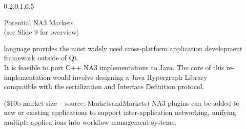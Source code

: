 \begin{frame}{}
{\begin{center}
\begin{minipage}{\textwidth}
{\begin{minipage}{\textwidth}
\begin{lightquadblockc}{0.2,0.1,0.5}{\parbox{21cm}{\vspace*{10pt}\centering Potential NA3 Markets \\(see Slide 9 for overview)\vspace*{10pt}}}
\begin{minipage}{1.08\textwidth}
{\begin{description}
language provides the most widely used cross-platform 
application development framework outside of Qt.  
\\It is feasible to port C++ NA3 implementations 
to Java.  The core of this re-implementation would 
involve designing a Java Hypergraph Library \\compatible 
with the \AtR{} serialization and Interface Definition 
protocol.\vspace{10pt}
\item[Workflow Management] 
({\texttildelow}\$10b market size -- 
source: 
{\selectfont MarketsandMarkets}) 
NA3 plugins can be added to new or existing 
applications to support inter-application 
networking, unifying multiple applications into workflow-management systems.
\vspace{.75em}  
\end{description}}\end{minipage}
\end{lightquadblockc}
\end{minipage}}


\end{minipage}
\end{center}
}

\end{frame}
